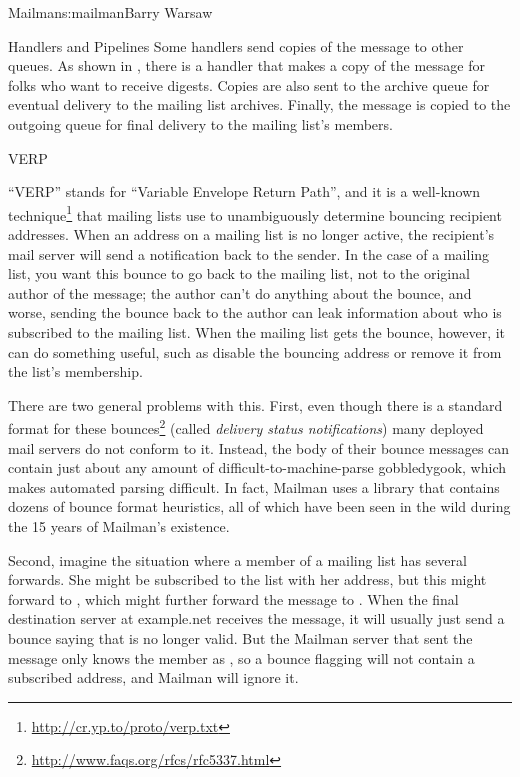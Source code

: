 \begin{aosachapter}{Mailman}{s:mailman}{Barry Warsaw}
\begin{aosasect1}{Handlers and Pipelines}
Some handlers send copies of the message to other queues.  As shown in
, there is a handler that makes a
copy of the message for folks who want to receive digests.  Copies are
also sent to the archive queue for eventual delivery to the mailing
list archives.  Finally, the message is copied to the outgoing queue
for final delivery to the mailing list's members.

\end{aosasect1}

\begin{aosasect1}{VERP}

``VERP'' stands for ``Variable Envelope Return Path'', and it is a
well-known technique\footnote{\url{http://cr.yp.to/proto/verp.txt}}
that mailing lists use to unambiguously determine bouncing
recipient addresses.  When an address on a mailing list is no longer
active, the recipient's mail server will send a notification back to
the sender.  In the case of a mailing list, you want this bounce to go
back to the mailing list, not to the original author of the message;
the author can't do anything about the bounce, and worse, sending the
bounce back to the author can leak information about who is subscribed
to the mailing list.  When the mailing list gets the bounce, however, it can do
something useful, such as disable the bouncing address or remove it
from the list's membership.

There are two general problems with this.  First, even though there is
a standard format for these
bounces\footnote{\url{http://www.faqs.org/rfcs/rfc5337.html}} (called
\emph{delivery status notifications}) many deployed mail servers do
not conform to it.  Instead, the body of their bounce messages can
contain just about any amount of difficult-to-machine-parse
gobbledygook, which makes automated parsing difficult.  In fact,
Mailman uses a library that contains dozens of bounce format
heuristics, all of which have been seen in the wild during the 15
years of Mailman's existence.

Second, imagine the situation where a member of a mailing list has
several forwards.  She might be subscribed to the list with her
 address, but this might forward to
, which might further forward the message to
.  When the final destination server at example.net
receives the message, it will usually just send a bounce saying that
 is no longer valid.  But the Mailman server that sent
the message only knows the member as , so a bounce
flagging  will not contain a subscribed address, and
Mailman will ignore it.


\end{aosasect1}
\end{aosachapter}
